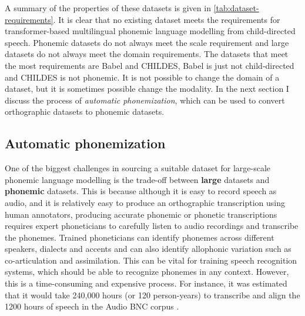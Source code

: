 A summary of the properties of these datasets is given in \cref{tab:dataset-requirements}. It is clear that no existing dataset meets the requirements for transformer-based multilingual phonemic language modelling from child-directed speech. Phonemic datasets do not always meet the scale requirement and large datasets do not always meet the domain requirements. The datasets that meet the most requirements are Babel and CHILDES, Babel is just not child-directed and CHILDES is not phonemic. It is not possible to change the domain of a dataset, but it is sometimes possible change the modality. In the next section I discuss the process of \textit{automatic phonemization}, which can be used to convert orthographic datasets to phonemic datasets. 

\subsection{Automatic phonemization}
\label{sec:dataset-phonemization}



One of the biggest challenges in sourcing a suitable dataset for large-scale phonemic language modelling is the trade-off between \textbf{large} datasets and \textbf{phonemic} datasets. This is because although it is easy to record speech as audio, and it is relatively easy to produce an orthographic transcription using human annotators, producing accurate phonemic or phonetic transcriptions requires expert phoneticians to carefully listen to audio recordings and transcribe the phonemes. Trained phoneticians can identify phonemes across different speakers, dialects and accents and can also identify allophonic variation such as co-articulation and assimilation. This can be vital for training speech recognition systems, which should be able to recognize phonemes in any context. However, this is a time-consuming and expensive process. For instance, it was estimated that it would take 240,000 hours (or 120 person-years) to transcribe and align the 1200 hours of speech in the Audio BNC corpus \citep{coleman2011mining}. 


